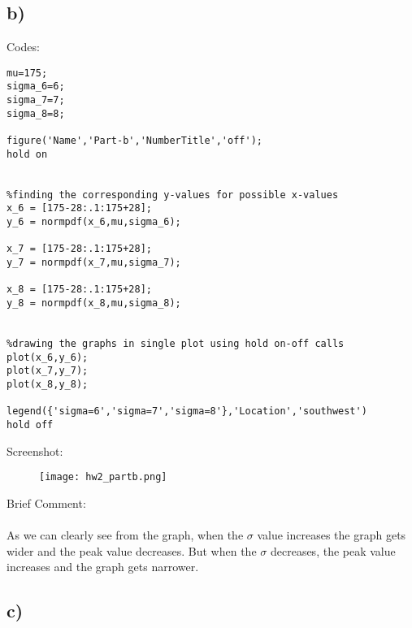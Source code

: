 \documentclass[12pt]{article}
\begin{document}
\subsection*{b)}
Codes:\\
\begin{lstlisting}[style=Matlab-editor]
%datas
mu=175;
sigma_6=6;
sigma_7=7;
sigma_8=8;

figure('Name','Part-b','NumberTitle','off');
hold on


%finding the corresponding y-values for possible x-values
x_6 = [175-28:.1:175+28];
y_6 = normpdf(x_6,mu,sigma_6);

x_7 = [175-28:.1:175+28];
y_7 = normpdf(x_7,mu,sigma_7);

x_8 = [175-28:.1:175+28];
y_8 = normpdf(x_8,mu,sigma_8);


%drawing the graphs in single plot using hold on-off calls
plot(x_6,y_6);
plot(x_7,y_7);
plot(x_8,y_8);

legend({'sigma=6','sigma=7','sigma=8'},'Location','southwest')
hold off

\end{lstlisting}
Screenshot:\\
\begin{figure}[H]
  \texttt{[image: hw2\_partb.png]}
  \centering
  \label{fig 2:Pdf with changing sigma values}
\end{figure}
Brief Comment:\\\\
As we can clearly see from the graph, when the $\sigma$ value increases the graph gets wider and the peak value decreases. But when the $\sigma$ decreases, the peak value increases and the graph gets narrower.
\subsection*{c)} 
\end{document}
